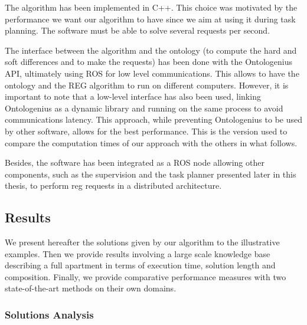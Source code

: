 \documentclass[a4paper,11pt,twoside]{StyleThese}
\begin{document}
The algorithm has been implemented in C++. This choice was motivated by the performance we want our algorithm to have since we aim at using it during task planning. The software must be able to solve several requests per second.

The interface between the algorithm and the ontology (to compute the hard and soft differences and to make the \sparql{} requests) has been done with the Ontologenius API, ultimately using ROS for low level communications. This allows to have the ontology and the REG algorithm to run on different computers. However, it is important to note that a low-level interface has also been used, linking Ontologenius as a dynamic library and running on the same process to avoid communications latency. This approach, while preventing Ontologenius to be used by other software, allows for the best performance. This is the version used to compare the computation times of our approach with the others in what follows.

Besides, the software has been integrated as a ROS node allowing other components, such as the supervision and the task planner presented later in this thesis, to perform \acrshort{reg} requests in a distributed architecture.


\subsection{Results}
We present hereafter the solutions given by our algorithm to the illustrative examples. Then we provide results involving a large scale knowledge base describing a full apartment in terms of execution time, solution length and composition. Finally, we provide comparative performance measures with two state-of-the-art methods on their own domains.

\subsubsection{Solutions Analysis}
\end{document}
